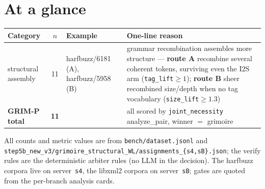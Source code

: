 \documentclass[11pt]{article}
\begin{document}
\section*{At a glance}
\begin{center}\small
\begin{tabular}{@{}p{3.8cm}clp{5.0cm}@{}}
\toprule
\textbf{Category} & \textbf{$n$} & \textbf{Example} & \textbf{One-line reason} \\
\midrule
structural assembly & 11 & harfbuzz/6181 (A), harfbuzz/5958 (B) & grammar recombination assembles more structure --- \textbf{route A} recombine several coherent tokens, surviving even the I2S arm (\texttt{tag\_lift}$\ge 1$); \textbf{route B} sheer recombined size/depth when no tag vocabulary (\texttt{size\_lift}$\ge 1.3$) \\
\midrule
\textbf{GRIM-P total} & \textbf{11} & & all scored by \texttt{joint\_necessity} analyze\_pair, winner $=$ grimoire \\
\bottomrule
\end{tabular}
\end{center}

\noindent\footnotesize All counts and metric values are from
\texttt{bench/dataset.jsonl} and
\texttt{step5b\_new\_v3/grimoire\_structural\_WL/assignments\_\{s4,sB\}.json};
the verify rules are the deterministic arbiter rules (no LLM in the decision).
The harfbuzz corpora live on server~\texttt{s4}, the libxml2 corpora on
server~\texttt{sB}; gates are quoted from the per-branch analysis cards.
\end{document}
